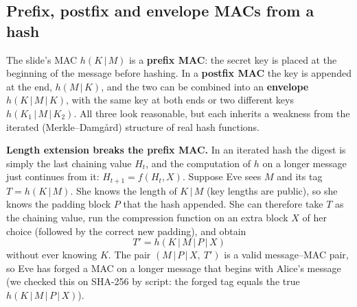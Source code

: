 \subsection{Prefix, postfix and envelope MACs from a hash \new}

The slide's MAC $h(K \,|\, M)$ is a \textbf{prefix MAC}: the secret key is placed at the beginning of the message before hashing. In a \textbf{postfix MAC} the key is appended at the end, $h(M \,|\, K)$, and the two can be combined into an \textbf{envelope} $h(K \,|\, M \,|\, K)$, with the same key at both ends or two different keys $h(K_1 \,|\, M \,|\, K_2)$. All three look reasonable, but each inherits a weakness from the iterated (Merkle--Damg\aa rd) structure of real hash functions.

\textbf{Length extension breaks the prefix MAC.} In an iterated hash the digest is simply the last chaining value $H_t$, and the computation of $h$ on a longer message just continues from it: $H_{t+1} = f(H_t, X)$. Suppose Eve sees $M$ and its tag $T = h(K \,|\, M)$. She knows the length of $K \,|\, M$ (key lengths are public), so she knows the padding block $P$ that the hash appended. She can therefore take $T$ as the chaining value, run the compression function on an extra block $X$ of her choice (followed by the correct new padding), and obtain
\[
T' = h(K \,|\, M \,|\, P \,|\, X)
\]
without ever knowing $K$. The pair $(M \,|\, P \,|\, X,\ T')$ is a valid message--MAC pair, so Eve has forged a MAC on a longer message that begins with Alice's message (we checked this on SHA-256 by script: the forged tag equals the true $h(K \,|\, M \,|\, P \,|\, X)$).
\begin{center}
\end{center}

